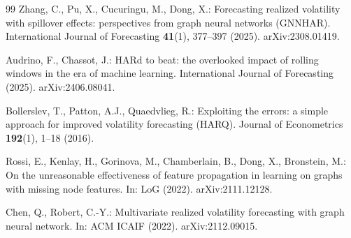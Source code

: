 \documentclass[runningheads]{llncs}
\begin{document}
\begin{thebibliography}{99}
Zhang, C., Pu, X., Cucuringu, M., Dong, X.: Forecasting realized volatility with spillover effects:
perspectives from graph neural networks (GNNHAR).
International Journal of Forecasting \textbf{41}(1), 377--397 (2025). arXiv:2308.01419.

Audrino, F., Chassot, J.: HARd to beat: the overlooked impact of rolling windows in the era of machine
learning. International Journal of Forecasting (2025). arXiv:2406.08041.

Bollerslev, T., Patton, A.J., Quaedvlieg, R.: Exploiting the errors: a simple approach for improved
volatility forecasting (HARQ). Journal of Econometrics \textbf{192}(1), 1--18 (2016).

Rossi, E., Kenlay, H., Gorinova, M., Chamberlain, B., Dong, X., Bronstein, M.: On the unreasonable
effectiveness of feature propagation in learning on graphs with missing node features. In: LoG (2022). arXiv:2111.12128.

Chen, Q., Robert, C.-Y.: Multivariate realized volatility forecasting with graph neural network.
In: ACM ICAIF (2022). arXiv:2112.09015.

\end{thebibliography}
\end{document}
